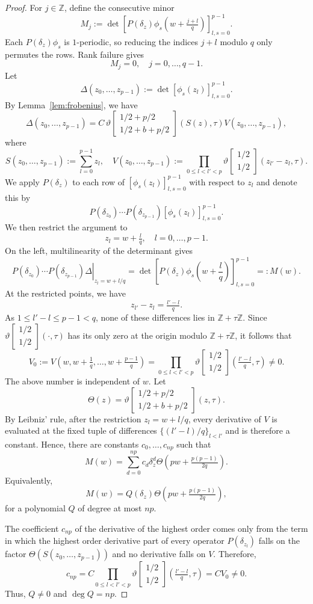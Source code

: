 \documentclass[10pt,a4paper]{amsart}
\newcommand{\Z}{\mathbb Z}
\newcommand{\dd}{\delta}
\newcommand{\thetac}[2]{{\vartheta\left[\begin{smallmatrix}
        #1 \\ #2
    \end{smallmatrix}\right]}}
\theoremstyle{plain}
\begin{document}
\begin{proof}
For $j\in\Z$, define the consecutive minor
$$
M_j:=
\det\left[
{P(\dd_z)}\phi_s\left(w+\tfrac{j+l}{q}\right)
\right]_{l,s=0}^{p-1}.
$$
Each $P(\dd_z)\phi_s$ is $1$-periodic, so reducing the indices
$j+l$ modulo $q$ only permutes the rows. 
Rank failure gives
$$
M_j=0,
\quad j=0,\dots,q-1.
$$
Let
$$
\Delta(z_0,\dots,z_{p-1})
:=
\det[\phi_s(z_l)]_{l,s=0}^{p-1}.
$$
By Lemma~\ref{lem:frobenius}, we have
$$
\Delta(z_0,\dots,z_{p-1})
=
C\, \thetac{1/2+p/2}{1/2+b+p/2}(S(z), \tau)V(z_0,\dots,z_{p-1}) ,
$$
where
$$
S(z_0,\dots,z_{p-1}):=\sum_{l=0}^{p-1} z_l,
\quad
V(z_0,\dots,z_{p-1})
:=\prod\limits_{0\leq l<l'< p}\thetac{1/2}{1/2}(z_{l'}-z_l,\tau).
$$
We apply $P(\dd_z)$ to each row of $[\phi_s(z_l)]_{l,s=0}^{p-1}$ with respect to $z_l$ and denote this by 
$$
P(\dd_{z_0})\cdots P(\dd_{z_{p-1}}) [\phi_s(z_l)]_{l,s=0}^{p-1}.
$$
We then restrict the argument to 
$$
z_l=w+\tfrac{l}{q},
\quad l=0,\dots,p-1.
$$
On the left, multilinearity of the determinant gives
$$
\left.
P(\dd_{z_0})\cdots P(\dd_{z_{p-1}})\Delta
\right|_{z_l=w+l/q}
=
\det\left[
P(\dd_z)\phi_s\left(w+\frac{l}{q}\right)
\right]_{l,s=0}^{p-1}
=:M(w).
$$
At the restricted points, we have
$$
z_{l'}-z_l=\tfrac{l'-l}{q}.
$$
As $1\leq l'-l\leq p-1<q$, none of these differences lies in
$\Z+\tau\Z$.  Since $\thetac{1/2}{1/2}(\cdot,\tau)$ has its only zero at the
origin modulo $\Z+\tau\Z$, it follows that
$$
V_0:=
V\left(w,w+\tfrac1q,\dots,w+\tfrac{p-1}{q}\right)
=
\prod\limits_{0\leq l <l'< p}\thetac{1/2}{1/2}(\tfrac{l'-l}{q},\tau)
\neq0.
$$
The above number is independent of $w$.
Let 
\begin{equation}
    \Theta(z)=\thetac{1/2+p/2}{1/2+b+p/2}(z,\tau).
\end{equation}
By Leibniz' rule, after the restriction $z_l=w+l/q$, every derivative of
$V$ is evaluated at the fixed tuple of differences
$\{(l'-l)/q\}_{l<l'}$ and is therefore a constant.  Hence, there are
constants $c_0,\dots,c_{np}$ such that
$$
M(w)
=
\sum_{d=0}^{np}c_d
\dd_z^d\Theta \left(pw+\tfrac{p(p-1)}{2q}\right).
$$
Equivalently,
$$
M(w)=Q(\dd_z)\Theta \left(pw+\tfrac{p(p-1)}{2q}\right),
$$
for a polynomial $Q$ of degree at most $np$.

The coefficient $c_{np}$ of the derivative of the highest order  comes only from the term in which the highest order
derivative part of every operator $P(\dd_{z_l})$
falls on the factor $\Theta(S(z_0,\dots,z_{p-1}))$ and no derivative falls on $V$. Therefore,
$$
c_{np}
=
C\prod_{0\leq l<l'< p}
\thetac{1/2}{1/2}\left(\tfrac{l'-l}{q},\tau\right)
=
CV_0
\neq0.
$$
Thus, $Q\neq0$ and $\deg Q={{n}}p$.


\end{proof}
\end{document}
